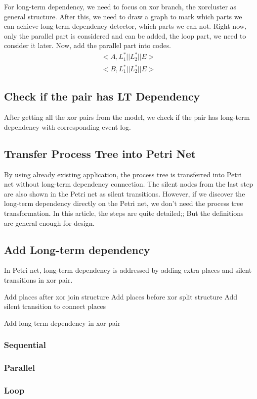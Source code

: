 \documentclass[]{article}
\begin{document}
For long-term dependency, we need to focus on xor branch, the xorcluster as general structure.
After this, we need to draw a graph to mark which parts we can achieve long-term dependency detector, which parts we can not. Right now, only the parallel part is considered and can be added, the loop part, we need to consider it later. Now, add the parallel part into codes.
\begin{align}
<A, L_{1}^{*} || L_{2}^{*} || E> \\
<B, L_{1}^{*} || L_{2}^{*} || E>
\end{align}
\subsection{Check if the pair has LT Dependency}
After getting all the xor pairs from the model, we check if the pair has long-term dependency with corresponding event log.


\subsection{Transfer Process Tree into Petri Net}
By using already existing application, the process tree is transferred into Petri net without long-term dependency connection. The silent nodes from the last step are also shown in the Petri net as silent transitions.
However, if we discover the long-term dependency directly on the Petri net, we don't need the process tree transformation. In this article, the steps are quite detailed;; But the definitions are general enough for design. 
\subsection{Add Long-term dependency}
In Petri net, long-term dependency is addressed by adding extra places and silent transitions in xor pair.  
\begin{algorithm}
	\SetAlgoLined
	Add places after xor join structure \;
	Add places before xor split structure\;
	Add silent transition to connect places\;
	\caption{Add long-term dependency in xor pair}
\end{algorithm}
\subsubsection{Sequential}

\subsubsection{Parallel}

\subsubsection{Loop}



\end{document}
